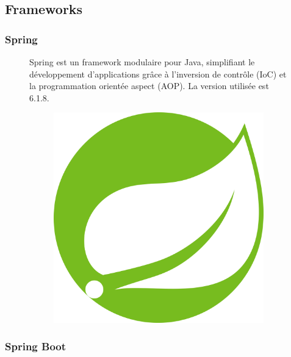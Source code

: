 \documentclass[12pt,a4paper]{report}
\begin{document}
	\subsection{Frameworks}
	
	\subsubsection{Spring}
	
	\begin{figure}[H]
		\begin{minipage}{0.8\textwidth}
			Spring est un framework modulaire pour Java, simplifiant le développement d'applications grâce à l’inversion de contrôle (IoC) et la programmation orientée aspect (AOP). La version utilisée est 6.1.8.
		\end{minipage}
		\hfill
		\begin{minipage}{0.15\textwidth} 
			\begin{figure}[H]
				\centering
				\includegraphics[width=\linewidth]{spring-logo.png}
				\label{fig:spring-logo}
			\end{figure}
		\end{minipage}
	\end{figure}
	
	\subsubsection{Spring Boot}
	
\end{document}

